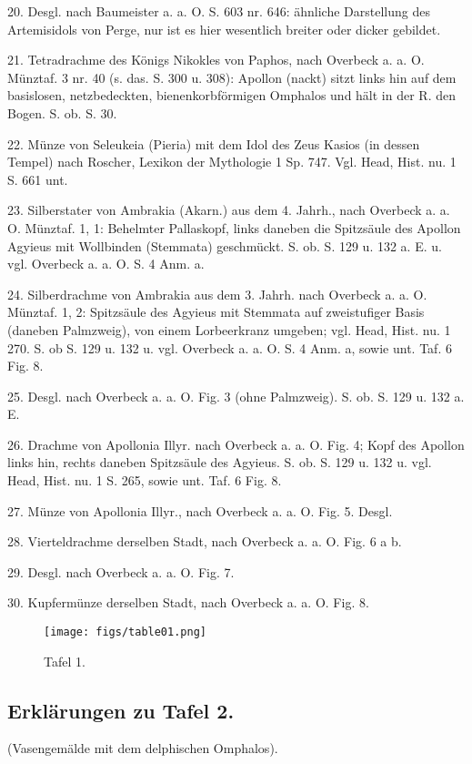 \documentclass[a4paper, 11pt, oneside]{article}
\begin{document}
20. Desgl. nach Baumeister a. a. O. S. 603 nr. 646: ähnliche Darstellung des Artemisidols von Perge, nur ist es hier wesentlich breiter oder dicker gebildet.

21. Tetradrachme des Königs Nikokles von Paphos, nach Overbeck a. a. O. Münztaf. 3 nr. 40 (s. das. S. 300 u. 308): Apollon (nackt) sitzt links hin auf dem basislosen, netzbedeckten, bienenkorbförmigen Omphalos und hält in der R. den Bogen. S. ob. S. 30.

22. Münze von Seleukeia (Pieria) mit dem Idol des Zeus Kasios (in dessen Tempel) nach Roscher, Lexikon der Mythologie 1 Sp. 747. Vgl. Head, Hist. nu. 1 S. 661 unt.

23. Silberstater von Ambrakia (Akarn.) aus dem 4. Jahrh., nach Overbeck a. a. O. Münztaf. 1, 1: Behelmter Pallaskopf, links daneben die Spitzsäule des Apollon Agyieus mit Wollbinden (Stemmata) geschmückt. S. ob. S. 129 u. 132 a. E. u. vgl. Overbeck a. a. O. S. 4 Anm. a.

24. Silberdrachme von Ambrakia aus dem 3. Jahrh. nach Overbeck a. a. O. Münztaf. 1, 2: Spitzsäule des Agyieus mit Stemmata auf zweistufiger Basis (daneben Palmzweig), von einem Lorbeerkranz umgeben; vgl. Head, Hist. nu. 1 270. S. ob S. 129 u. 132 u. vgl. Overbeck a. a. O. S. 4 Anm. a, sowie unt. Taf. 6 Fig. 8.

25. Desgl. nach Overbeck a. a. O. Fig. 3 (ohne Palmzweig). S. ob. S. 129 u. 132 a. E.

26. Drachme von Apollonia Illyr. nach Overbeck a. a. O. Fig. 4; Kopf des Apollon links hin, rechts daneben Spitzsäule des Agyieus. S. ob. S. 129 u. 132 u. vgl. Head, Hist. nu. 1 S. 265, sowie unt. Taf. 6 Fig. 8.

27. Münze von Apollonia Illyr., nach Overbeck a. a. O. Fig. 5. Desgl.

28. Vierteldrachme derselben Stadt, nach Overbeck a. a. O. Fig. 6 a b.

29. Desgl. nach Overbeck a. a. O. Fig. 7.

30. Kupfermünze derselben Stadt, nach Overbeck a. a. O. Fig. 8.
\clearpage
\vspace*{\fill}
\begin{figure}[H]
\centering
\texttt{[image: figs/table01.png]}
\caption{Tafel 1.}
\end{figure}
\vspace*{\fill}
\clearpage
\subsection{Erklärungen zu Tafel 2.}
\begin{center}
(Vasengemälde mit dem delphischen Omphalos).
\end{center}
\end{document}
